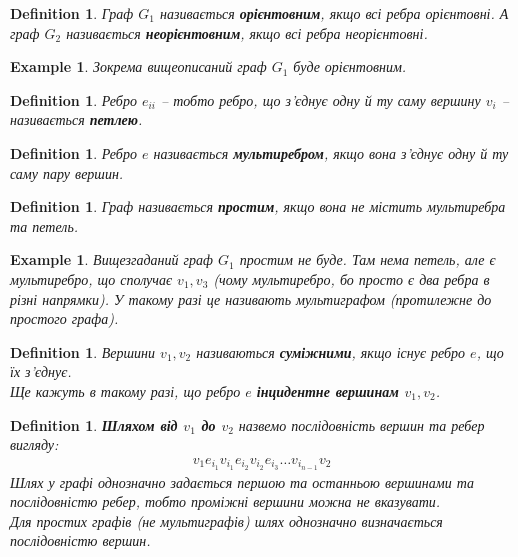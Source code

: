 \documentclass[a4paper, 14pt]{extarticle}
\theoremstyle{theoremdd}
\theoremstyle{theoremdd}
\newtheorem{definition}[theorem]{Definition}
\theoremstyle{theoremdd}
\theoremstyle{theoremdd}
\theoremstyle{theoremdd}
\newtheorem{example}[theorem]{Example}
\theoremstyle{theoremdd}
\theoremstyle{theoremdd}
\theoremstyle{theoremdd}
\theoremstyle{theoremdd}
\theoremstyle{theoremdd}
\theoremstyle{theoremdd}
\theoremstyle{theoremdd}
\theoremstyle{theoremdd}
\theoremstyle{theoremdd}
\theoremstyle{theoremdd}
\begin{document}
\begin{definition}
Граф $G_1$ називається \textbf{орієнтовним}, якщо всі ребра орієнтовні. А граф $G_2$ називається \textbf{неорієнтовним}, якщо всі ребра неорієнтовні.
\end{definition}

\begin{example}
Зокрема вищеописаний граф $G_1$ буде орієнтовним.
\end{example}

\begin{definition}
Ребро $e_{ii}$ -- тобто ребро, що з'єднує одну й ту саму вершину $v_i$ -- називається \textbf{петлею}.
\end{definition}

\begin{definition}
Ребро $e$ називається \textbf{мультиребром}, якщо вона з'єднує одну й ту саму пару вершин.
\end{definition}

\begin{definition}
Граф називається \textbf{простим}, якщо вона не містить мультиребра та петель.
\end{definition}

\begin{example}
Вищезгаданий граф $G_1$ простим не буде. Там нема петель, але є мультиребро, що сполучає $v_1,v_3$ (чому мультиребро, бо просто є два ребра в різні напрямки). У такому разі це називають мультиграфом (протилежне до простого графа).
\end{example}

\begin{definition}
Вершини $v_1,v_2$ називаються \textbf{суміжними}, якщо існує ребро $e$, що їх з'єднує.\\
Ще кажуть в такому разі, що ребро $e$ \textbf{інцидентне вершинам $v_1,v_2$}. 
\end{definition}

\begin{definition}
\textbf{Шляхом від $v_1$ до $v_2$} назвемо послідовність вершин та ребер вигляду:
\begin{align*}
v_1 e_{i_1} v_{i_1} e_{i_2} v_{i_2} e_{i_3} \dots v_{i_{n-1}} v_2
\end{align*}
Шлях у графі однозначно задається першою та останньою вершинами та послідовністю ребер, тобто проміжні вершини можна не вказувати.\\
Для простих графів (не мультиграфів) шлях однозначно визначається послідовністю вершин.
\end{definition}
\end{document}
